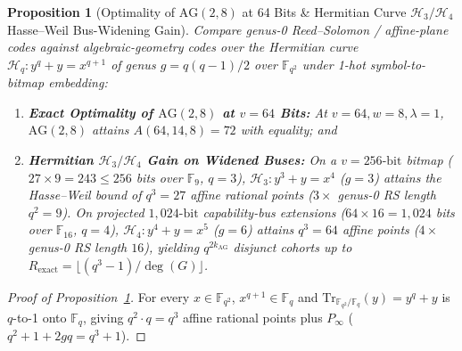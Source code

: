 \documentclass[11pt,letterpaper]{article}
\theoremstyle{spectralthm}
\newtheorem{proposition}[theorem]{Proposition}
\begin{document}
\begin{proposition}[Optimality of $\mathrm{AG}(2,8)$ at 64 Bits \& Hermitian Curve $\mathcal{H}_3 / \mathcal{H}_4$ Hasse--Weil Bus-Widening Gain]
\label{prop:hermitian_ag}
Compare genus-0 Reed--Solomon / affine-plane codes against algebraic-geometry codes over the Hermitian curve $\mathcal{H}_q : y^q + y = x^{q+1}$ of genus $g = q(q-1)/2$ over $\mathbb{F}_{q^2}$ under 1-hot symbol-to-bitmap embedding:
\begin{enumerate}
  \item[(i)] \textbf{Exact Optimality of $\mathrm{AG}(2,8)$ at $v = 64$ Bits:} At $v=64, w=8, \lambda=1$, $\mathrm{AG}(2,8)$ attains $A(64,14,8) = 72$ with equality; and
  \item[(ii)] \textbf{Hermitian $\mathcal{H}_3 / \mathcal{H}_4$ Gain on Widened Buses:} On a $v = 256\text{-bit}$ bitmap ($27 \times 9 = 243 \le 256$ bits over $\mathbb{F}_9$, $q=3$), $\mathcal{H}_3 : y^3 + y = x^4$ ($g = 3$) attains the Hasse--Weil bound of $q^3 = 27$ affine rational points ($3\times$ genus-0 RS length $q^2 = 9$). On projected $1,024\text{-bit}$ capability-bus extensions ($64 \times 16 = 1,024$ bits over $\mathbb{F}_{16}$, $q=4$), $\mathcal{H}_4 : y^4 + y = x^5$ ($g = 6$) attains $q^3 = 64$ affine points ($4\times$ genus-0 RS length $16$), yielding $q^{2 k_{\mathrm{AG}}}$ disjunct cohorts up to $R_{\mathrm{exact}} = \lfloor (q^3 - 1)/\deg(G) \rfloor$.
\end{enumerate}
\end{proposition}
\begin{proof}[Proof of Proposition~\ref{prop:hermitian_ag}]
For every $x \in \mathbb{F}_{q^2}$, $x^{q+1} \in \mathbb{F}_q$ and $\mathrm{Tr}_{\mathbb{F}_{q^2}/\mathbb{F}_q}(y) = y^q + y$ is $q$-to-1 onto $\mathbb{F}_q$, giving $q^2 \cdot q = q^3$ affine rational points plus $P_\infty$ ($q^2 + 1 + 2gq = q^3 + 1$).
\end{proof}
\end{document}
